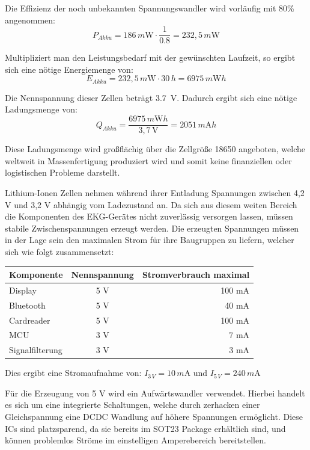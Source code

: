 Die Effizienz der noch unbekannten Spannungswandler wird vorläufig mit 80\% angenommen:
$$ P_{Akku} = 186\,m\mbox{W} \cdot \frac{1}{0.8} = 232,5\,m\mbox{W} $$

Multipliziert man den Leistungsbedarf mit der gewünschten Laufzeit, so ergibt sich eine nötige Energiemenge von:
$$ E_{Akku} = 232,5\,m\mbox{W} \cdot 30\,h = 6975\,m\mbox{W}h $$

Die Nennspannung dieser Zellen beträgt \SI{3,7}{\volt}. Dadurch ergibt sich eine nötige Ladungsmenge von: 
$$ Q_{Akku} = \frac{6975\,m \mbox{W} h}{3,7\,\mbox{V}} = 2051\,m\mbox{A}h $$

Diese Ladungsmenge wird großflächig über die Zellgröße 18650 angeboten, welche weltweit in Massenfertigung produziert wird und somit keine finanziellen oder logistischen Probleme darstellt.

Lithium-Ionen Zellen nehmen während ihrer Entladung Spannungen zwischen 4,2 V und 3,2 V abhängig vom Ladezustand an. Da sich aus diesem weiten Bereich die Komponenten des EKG-Gerätes nicht zuverlässig versorgen lassen, müssen stabile Zwischenspannungen erzeugt werden. Die erzeugten Spannungen müssen in der Lage sein den maximalen Strom für ihre Baugruppen zu liefern, welcher sich wie folgt zusammensetzt:

\begin{table}[h]
\center
\begin{tabular}[h]{l|c|r}
Komponente & Nennspannung & Stromverbrauch maximal\\
\hline
Display & 5 V & 100 mA \cite{Datenblatt_Nextion}\\
Bluetooth & 5 V & 40 mA \cite{HC-05_Datasheet}\\
Cardreader & 5 V & 100 mA \cite{SD_Karte}\\
MCU & 3 V & 7 mA \cite{Datenblatt_MSP430F5529}\\
Signalfilterung & 3  V & 3 mA \\
\end{tabular}
\end{table}

Dies ergibt eine Stromaufnahme von: $ I_{3\,V} = 10\,m\mbox{A}$ und $I_{5\,V} = 240\,m\mbox{A} $

Für die Erzeugung von 5 V wird ein Aufwärtswandler verwendet. Hierbei handelt es sich um eine integrierte Schaltungen, welche durch zerhacken einer Gleichspannung eine DCDC Wandlung auf höhere Spannungen ermöglicht. Diese ICs sind platzsparend, da sie bereits im SOT23 Package erhältlich sind, und können problemlos Ströme im einstelligen Amperebereich bereitstellen. 

